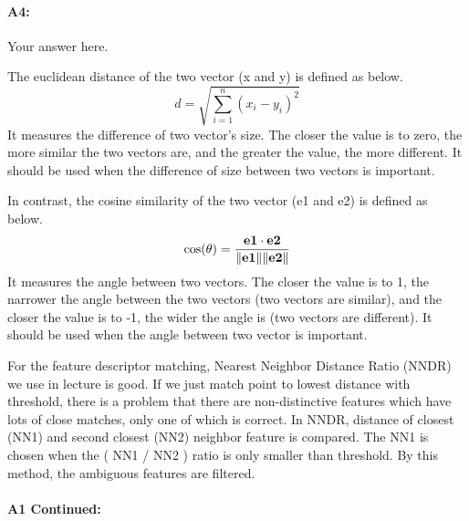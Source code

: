 \paragraph{A4:} Your answer here.


The euclidean distance of the two vector (x and y) is defined as below.
\begin{equation}
d= \sqrt{\sum^n_{i=1} (x_i - y_i)^2}
\end{equation}
It measures the difference of two vector's size. The closer the value is to zero, the more similar the two vectors are, and the greater the value, the more different. It should be used when the difference of size between two vectors is important.


In contrast, the cosine similarity of the two vector (e1 and e2) is defined as below. 
\begin{equation}
\cos (\theta)= {{\bf e1} \cdot {\bf e2} \over \|{\bf e1}\| \|{\bf e2}\|}
\end{equation}
It measures the angle between two vectors. The closer the value is to 1, the narrower the angle between the two vectors (two vectors are similar), and the closer the value is to -1, the wider the angle is (two vectors are different). It should be used when the angle between two vector is important.


For the feature descriptor matching, Nearest Neighbor Distance Ratio (NNDR) we use in lecture is good. If we just match point to lowest distance with threshold, there is a problem that there are non-distinctive features which have lots of close matches, only one of which is correct. In NNDR, distance of closest (NN1) and second closest (NN2) neighbor feature is compared. The NN1 is chosen when the ( NN1 / NN2 ) ratio is only smaller than threshold. By this method, the ambiguous features are filtered.



\pagebreak
\paragraph{A1 Continued:} 



